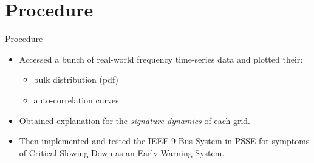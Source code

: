 \section[Procedure]{Procedure}
\label{sec:procedure}

\begin{frame}{Procedure}
	\begin{itemize}
		\item Accessed a bunch of real-world frequency time-series data and plotted their:
			\begin{itemize}
				\item bulk distribution (pdf) 
				\item auto-correlation curves
			\end{itemize}
		\item Obtained explanation for the \textit{signature dynamics}	of each grid.
		\item Then implemented and tested the IEEE 9 Bus System in PSSE for symptoms of Critical Slowing Down as an Early Warning System. 		
	\end{itemize}
\end{frame}